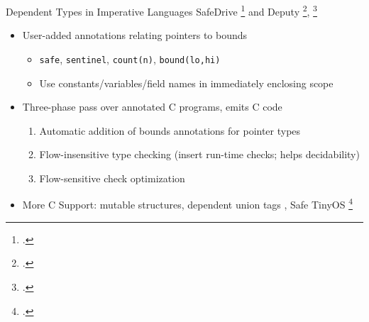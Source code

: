 \documentclass[aspectratio=169]{beamer}
\begin{document}
\begin{frame}{Dependent Types in Imperative Languages}
SafeDrive \footcite{zhou_safedrive:_2006} and Deputy \footcite{condit_dependent_2007}, \footcite{anderson_static_2007}
    \begin{itemize}[<+->]
        \item User-added annotations relating pointers to bounds
            \begin{itemize}
                \item \texttt{safe}, \texttt{sentinel}, \texttt{count(n)}, \texttt{bound(lo,hi)}
                \item Use constants/variables/field names in immediately enclosing scope 
            \end{itemize}
        \item Three-phase pass over annotated C programs, emits C code
            \begin{enumerate}
                \item Automatic addition of bounds annotations for pointer types 
                \item Flow-insensitive type checking (insert run-time checks; helps decidability) 
                \item Flow-sensitive check optimization
            \end{enumerate}
        \item More C Support: mutable structures, dependent union tags , Safe TinyOS \footcite{cooprider_efficient_2007} %
    \end{itemize}
    \vspace{0.2in}
\end{frame}
\end{document}
